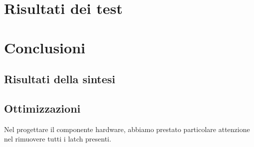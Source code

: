 \documentclass[12pt, table, xcdraw]{article}
\begin{document}
\newpage
\section{Risultati dei test}

\newpage
\section{Conclusioni}
\newpage

\subsection{Risultati della sintesi}
\subsection{Ottimizzazioni}
Nel progettare il componente hardware, abbiamo prestato particolare attenzione nel rimuovere tutti i latch presenti.
\end{document}

